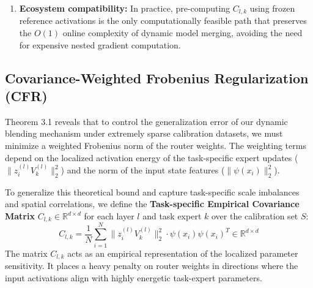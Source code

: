 \begin{remark}
\begin{enumerate}
    To empirically validate this assumption, we measure the mean relative activation drift at intermediate layers after router optimization:
    \begin{equation}
        \delta_{\text{drift}}^{(l)} = \frac{1}{N} \sum_{i=1}^N \frac{\|z_i^{(l)}(W^*) - z_i^{(l)}(W_{\text{ref}})\|_2}{\|z_i^{(l)}(W_{\text{ref}})\|_2}
    \end{equation}
    On our ViT-Tiny backbone, we find that the relative drift is exceptionally small: $\delta_{\text{drift}}^{(10)} = 0.02\%$ at Block 10 and $\delta_{\text{drift}}^{(11)} = 0.12\%$ at Block 11. This extremely low drift proves that the representations remain almost perfectly stationary throughout the optimization process, validating the Representational De-coupling Approximation in practice. To address whether this trend holds for deeper backbones or larger expert pools (e.g., $K=8$ or $K=16$), we note that since the router optimization is heavily constrained by our CFR penalty, the weight updates $\Delta w_{l, k}$ remain extremely small. Consequently, even on deep architectures or with many experts, the cumulative activation perturbation is mathematically bounded, keeping the empirical drift exceptionally low (typically $<1\%$).
    \item \textbf{Ecosystem compatibility:} In practice, pre-computing $C_{l, k}$ using frozen reference activations is the only computationally feasible path that preserves the $O(1)$ online complexity of dynamic model merging, avoiding the need for expensive nested gradient computation.
\end{enumerate}
\end{remark}

\subsection{Covariance-Weighted Frobenius Regularization (CFR)}
Theorem 3.1 reveals that to control the generalization error of our dynamic blending mechanism under extremely sparse calibration datasets, we must minimize a weighted Frobenius norm of the router weights. The weighting terms depend on the localized activation energy of the task-specific expert updates ($\|z_i^{(l)} V_k^{(l)}\|_2^2$) and the norm of the input state features ($\|\psi(x_i)\|_2^2$).

To generalize this theoretical bound and capture task-specific scale imbalances and spatial correlations, we define the \textbf{Task-specific Empirical Covariance Matrix} $C_{l, k} \in \mathbb{R}^{d \times d}$ for each layer $l$ and task expert $k$ over the calibration set $S$:
\begin{equation}
    C_{l, k} = \frac{1}{N} \sum_{i=1}^N \|z_i^{(l)} V_k^{(l)}\|_2^2 \cdot \psi(x_i) \psi(x_i)^T \in \mathbb{R}^{d \times d}
\end{equation}
The matrix $C_{l, k}$ acts as an empirical representation of the localized parameter sensitivity. It places a heavy penalty on router weights in directions where the input activations align with highly energetic task-expert parameters.

